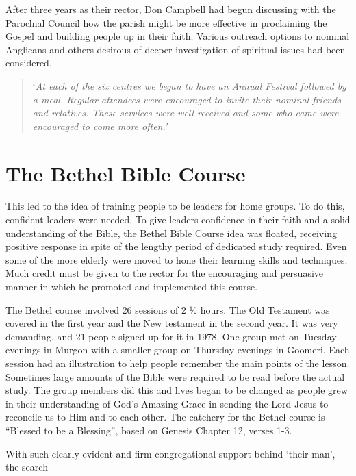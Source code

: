 After three years as their rector, Don Campbell had begun discussing
with the Parochial Council how the parish might be more effective in
proclaiming the Gospel and building people up in their faith. Various
outreach options to nominal Anglicans and others desirous of deeper
investigation of spiritual issues had been considered.

\begin{quote}
`\emph{At each of the six centres we began to have an Annual Festival
followed by a meal. Regular attendees were encouraged to invite their
nominal friends and relatives. These services were well received and
some who came were encouraged to come more often.'}
\end{quote}

\hypertarget{the-bethel-bible-course}{%
\section{The Bethel Bible Course}\label{the-bethel-bible-course}}

This led to the idea of training people to be leaders for home groups.
To do this, confident leaders were needed. To give leaders confidence in
their faith and a solid understanding of the Bible, the Bethel Bible
Course idea was floated, receiving positive response in spite of the
lengthy period of dedicated study required. Even some of the more
elderly were moved to hone their learning skills and techniques. Much
credit must be given to the rector for the encouraging and persuasive
manner in which he promoted and implemented this course.

The Bethel course involved 26 sessions of 2 ½ hours. The Old Testament
was covered in the first year and the New testament in the second year.
It was very demanding, and 21 people signed up for it in 1978. One group
met on Tuesday evenings in Murgon with a smaller group on Thursday
evenings in Goomeri. Each session had an illustration to help people
remember the main points of the lesson. Sometimes large amounts of the
Bible were required to be read before the actual study. The group
members did this and lives began to be changed as people grew in their
understanding of God's Amazing Grace in sending the Lord Jesus to
reconcile us to Him and to each other. The catchcry for the Bethel
course is ``Blessed to be a Blessing'', based on Genesis Chapter 12,
verses 1-3.

With such clearly evident and firm congregational support behind `their
man', the search

